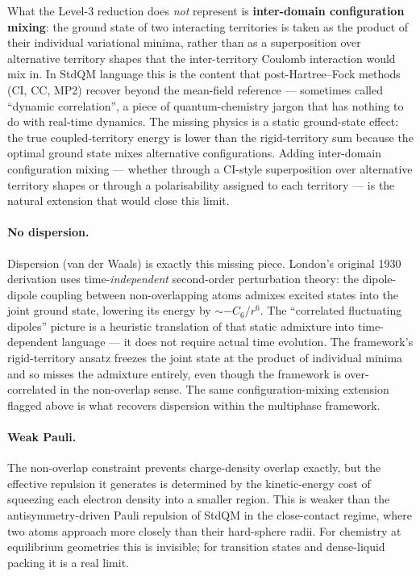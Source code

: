 What the Level-3 reduction does \emph{not} represent is \textbf{inter-domain configuration mixing}: the ground state of two interacting territories is taken as the product of their individual variational minima, rather than as a superposition over alternative territory shapes that the inter-territory Coulomb interaction would mix in. In StdQM language this is the content that post-Hartree--Fock methods (CI, CC, MP2) recover beyond the mean-field reference --- sometimes called ``dynamic correlation'', a piece of quantum-chemistry jargon that has nothing to do with real-time dynamics. The missing physics is a static ground-state effect: the true coupled-territory energy is lower than the rigid-territory sum because the optimal ground state mixes alternative configurations. Adding inter-domain configuration mixing --- whether through a CI-style superposition over alternative territory shapes or through a polarisability assigned to each territory --- is the natural extension that would close this limit.

\paragraph{No dispersion.}
Dispersion (van der Waals) is exactly this missing piece. London's original 1930 derivation uses time-\emph{independent} second-order perturbation theory: the dipole-dipole coupling between non-overlapping atoms admixes excited states into the joint ground state, lowering its energy by $\sim -C_6/r^6$. The ``correlated fluctuating dipoles'' picture is a heuristic translation of that static admixture into time-dependent language --- it does not require actual time evolution. The framework's rigid-territory ansatz freezes the joint state at the product of individual minima and so misses the admixture entirely, even though the framework is over-correlated in the non-overlap sense. The same configuration-mixing extension flagged above is what recovers dispersion within the multiphase framework.

\paragraph{Weak Pauli.}
The non-overlap constraint prevents charge-density overlap exactly, but the effective repulsion it generates is determined by the kinetic-energy cost of squeezing each electron density into a smaller region. This is weaker than the antisymmetry-driven Pauli repulsion of StdQM in the close-contact regime, where two atoms approach more closely than their hard-sphere radii. For chemistry at equilibrium geometries this is invisible; for transition states and dense-liquid packing it is a real limit.

